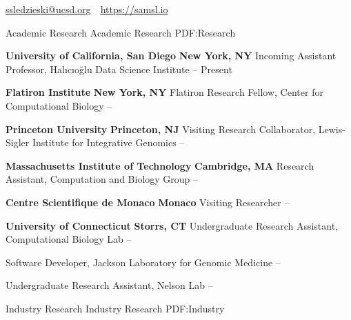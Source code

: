 \documentclass[letterpaper,MMMyyyy,nonstopmode]{simpleresumecv}
\newcommand{\CVAuthor}{Samuel Sledzieski}
\newcommand{\CVWebpage}{https://samsl.io}
\begin{document}
\Title{\CVAuthor}

\begin{SubTitle}
\href{mailto:ssledzieski@ucsd.org}
{ssledzieski@ucsd.org}
\,\SubBulletSymbol\,
\href{\CVWebpage}
{\url{\CVWebpage}}
\,\SubBulletSymbol\,
\end{SubTitle}

\begin{Body}

\Section
{Academic Research}
{Academic Research}
{PDF:Research}

\Entry
{\textbf{University of California, San Diego}}
\hfill \textbf{New York, NY}
\Gap
\Item Incoming Assistant Professor, Halıcıoğlu Data Science Institute
\hfill
{} -- Present
\BigGap

\Entry
{\textbf{Flatiron Institute}}
\hfill \textbf{New York, NY}
\Gap
\Item Flatiron Research Fellow, Center for Computational Biology
\hfill
{} -- 
\BigGap

\Entry
{\textbf{Princeton University}}
\hfill \textbf{Princeton, NJ}
\Gap
\Item Visiting Research Collaborator, Lewis-Sigler Institute for Integrative Genomics
\hfill
{} -- 
\BigGap

\Entry
{\textbf{Massachusetts Institute of Technology}}
\hfill \textbf{Cambridge, MA}
\Gap
\Item Research Assistant, Computation and Biology Group
\hfill
{} -- 
\BigGap

\Entry
{\textbf{Centre Scientifique de Monaco}}
\hfill \textbf{Monaco}
\Gap
\Item Visiting Researcher
\hfill
{} -- 
\BigGap

\Entry
{\textbf{University of Connecticut}}
\hfill \textbf{Storrs, CT}
\Gap
\Item Undergraduate Research Assistant, Computational Biology Lab
\hfill
{} --

\Gap
\Item Software Developer, Jackson Laboratory for Genomic Medicine
\hfill
{} --

\Gap
\Item Undergraduate Research Assistant, Nelson Lab
\hfill
{} --

\BigGap
\Section
{Industry Research}
{Industry Research}
{PDF:Industry}


\end{Body}
\end{document}
